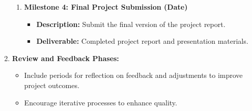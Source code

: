 \documentclass[aspectratio=169]{beamer}
\begin{document}
\begin{frame}[fragile]
\begin{enumerate}
\begin{enumerate}
                \item \textbf{Milestone 4: Final Project Submission (Date)}
                    \begin{itemize}
                        \item \textbf{Description:} Submit the final version of the project report.
                        \item \textbf{Deliverable:} Completed project report and presentation materials.
                    \end{itemize}
            \end{enumerate}
        
        \item \textbf{Review and Feedback Phases:}
            \begin{itemize}
                \item Include periods for reflection on feedback and adjustments to improve project outcomes.
                \item Encourage iterative processes to enhance quality.
            \end{itemize}
    \end{enumerate}
\end{frame}
\end{document}
